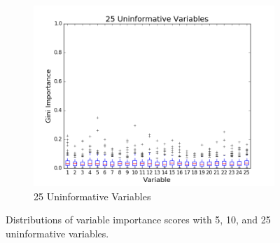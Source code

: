 \begin{figure}[h!]
\begin{subfigure}[b]{0.45\textwidth}
    \includegraphics[width=\textwidth]{figures/random_forests/rf_variable_count_bias_25.png}
    \caption{25 Uninformative Variables}
    \label{fig:var-count-25}
  \end{subfigure}
  \caption{Distributions of variable importance scores with 5, 10, and 25 uninformative variables.}
  \label{fig:var-count}
\end{figure}

